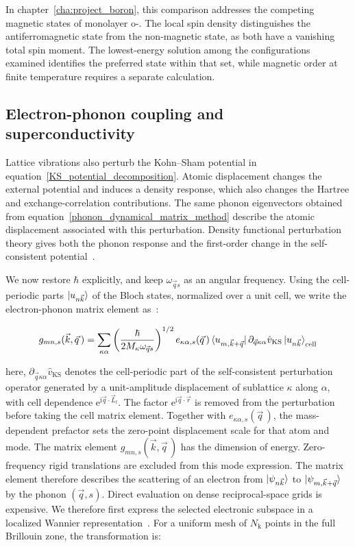 In chapter~\ref{cha:project_boron},
this comparison addresses the competing magnetic states of monolayer o-.
The local spin density distinguishes the antiferromagnetic state from the non-magnetic state, as both have a vanishing total spin moment.
The lowest-energy solution among the configurations examined identifies the preferred state within that set,
while magnetic order at finite temperature requires a separate calculation.

\FloatBarrier
\subsection{Electron-phonon coupling and superconductivity}
\label{subsec:method_elph}

Lattice vibrations also perturb the Kohn--Sham potential in equation~\eqref{KS_potential_decomposition}.
Atomic displacement changes the external potential and induces a density response,
which also changes the Hartree and exchange-correlation contributions.
The same phonon eigenvectors obtained from equation~\eqref{phonon_dynamical_matrix_method}
describe the atomic displacement associated with this perturbation.
Density functional perturbation theory gives both the phonon response and the first-order change in the self-consistent potential~\cite{baroni2001phonons}.

We now restore $\hbar$ explicitly, and keep $\omega_{\vec{q}s}$ as an angular frequency.
Using the cell-periodic parts $\ket{u_{n\vec{k}}}$ of the Bloch states, normalized over a unit cell,
we write the electron-phonon matrix element as~\cite{giustino2017electron}:

\begin{equation}
    g_{mn,s}(\vec{k},\vec{q}\,)
    =
    \sum_{\kappa\alpha}
    \left(\frac{\hbar}{2M_\kappa\omega_{\vec{q}s}}\right)^{1/2}
    e_{\kappa\alpha,s}(\vec{q}\,)
    \bra{u_{m,\vec{k}+\vec{q}}}
    \partial_{\vec{q}\kappa\alpha}\hat{v}_\mathrm{KS}
    \ket{u_{n\vec{k}}}_\mathrm{cell}
\label{electron_phonon_matrix_element_method}
\end{equation}

here, $\partial_{\vec{q}\kappa\alpha}\hat{v}_\mathrm{KS}$ denotes the cell-periodic part of the self-consistent perturbation operator generated by a unit-amplitude displacement of sublattice $\kappa$ along $\alpha$,
with cell dependence $\mathrm{e}^{\mathrm{i}\vec{q}\cdot\vec{L}_l}$.
The factor $\mathrm{e}^{\mathrm{i}\vec{q}\cdot\vec{r}}$ is removed from the perturbation before taking the cell matrix element.
Together with $e_{\kappa\alpha,s}(\vec{q}\,)$,
the mass-dependent prefactor sets the zero-point displacement scale for that atom and mode.
The matrix element $g_{mn,s}(\vec{k},\vec{q}\,)$ has the dimension of energy.
Zero-frequency rigid translations are excluded from this mode expression.
The matrix element therefore describes the scattering of an electron from $\ket{\psi_{n\vec{k}}}$ to $\ket{\psi_{m,\vec{k}+\vec{q}}}$ by the phonon $(\vec{q},s)$.
Direct evaluation on dense reciprocal-space grids is expensive.
We therefore first express the selected electronic subspace in a localized Wannier representation~\cite{pizzi2020wannier90}.
For a uniform mesh of $N_\mathrm{k}$ points in the full Brillouin zone, the transformation is:

